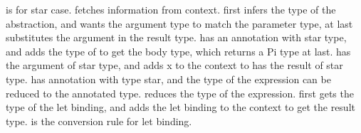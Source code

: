  is for star case.  fetches information from context.  first infers the type of the abstraction, and wants the argument type to match the parameter type, at last substitutes the argument in the result type.  has an annotation with star type, and adds the type of  to get the body type, which returns a Pi type at last.  has the argument of star type, and adds \lst x to the context to has the result of star type.  has annotation with type star, and the type of the expression can be reduced to the annotated type.  reduces the type of the expression.  first gets the type of the let binding, and adds the let binding to the context to get the result type.  is the conversion rule for let binding.

